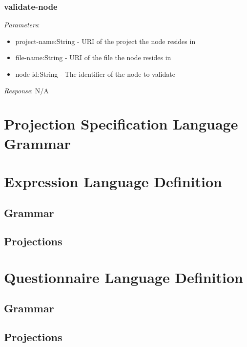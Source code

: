 \subsubsection{validate-node}

\emph{Parameters}: 
\begin{itemize}
\item project-name:String - URI of the project the node resides in
\item file-name:String - URI of the file the node resides in
\item node-id:String - The identifier of the node to validate
\end{itemize}
\emph{Response}: N/A

\section{Projection Specification Language Grammar}\label{editorLanguageGrammar}


\section{Expression Language Definition}\label{expressionLanguageDef}
\subsection{Grammar}


\subsection{Projections}\label{expressionLanguageDefEditor}


\section{Questionnaire Language Definition}\label{questionnaireLanguageDef}

\subsection{Grammar}


\subsection{Projections}\label{questionnaireLanguageDefEditor}



